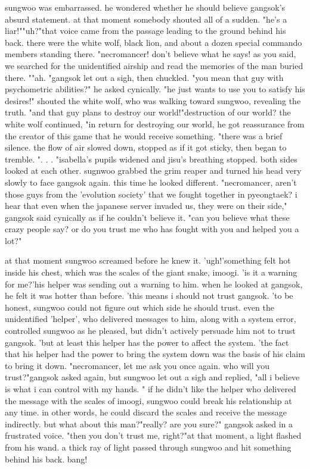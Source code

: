  sungwoo was embarrassed.
 he wondered whether he should believe gangsok's absurd statement.
at that moment somebody shouted all of a sudden.
"he's a liar!""uh?"that voice came from the passage leading to the ground behind his back.
there were the white wolf, black lion, and about a dozen special commando members standing there.
"necromancer! don't believe what he says! as you said, we searched for the unidentified airship and read the memories of the man buried there.
""ah.
"gangsok let out a sigh, then chuckled.
 "you mean that guy with psychometric abilities?" he asked cynically.
 "he just wants to use you to satisfy his desires!" shouted the white wolf, who was walking toward sungwoo, revealing the truth.
 "and that guy plans to destroy our world!"destruction of our world? the white wolf continued, "in return for destroying our world, he got reassurance from the creator of this game that he would receive something.
"there was a brief silence.
 the flow of air slowed down, stopped as if it got sticky, then began to tremble.
".
.
.
"isabella's pupils widened and jisu's breathing stopped.
 both sides looked at each other.
sugnwoo grabbed the grim reaper and turned his head very slowly to face gangsok again.
 this time he looked different.
 "necromancer, aren't those guys from the 'evolution society' that we fought together in pyeongtaek? i hear that even when the japanese server invaded us, they were on their side," gangsok said cynically as if he couldn't believe it.
 "can you believe what these crazy people say? or do you trust me who has fought with you and helped you a lot?"

at that moment sungwoo screamed before he knew it.
 'ugh!'something felt hot inside his chest, which was the scales of the giant snake, imoogi.
'is it a warning for me?'his helper was sending out a warning to him.
 when he looked at gangsok, he felt it was hotter than before.
'this means i should not trust gangsok.
'to be honest, sungwoo could not figure out which side he should trust.
even the unidentified 'helper', who delivered messages to him, along with a system error, controlled sungwoo as he pleased, but didn't actively persuade him not to trust gangsok.
'but at least this helper has the power to affect the system.
'the fact that his helper had the power to bring the system down was the basis of his claim to bring it down.
"necromancer, let me ask you once again.
 who will you trust?"gangsok asked again, but sungwoo let out a sigh and replied, "all i believe is what i can control with my hands.
" if he didn't like the helper who delivered the message with the scales of imoogi, sungwoo could break his relationship at any time.
 in other words, he could discard the scales and receive the message indirectly.
 but what about this man?"really? are you sure?" gangsok asked in a frustrated voice.
 "then you don't trust me, right?"at that moment, a light flashed from his wand.
 a thick ray of light passed through sungwoo and hit something behind his back.
bang!

 
